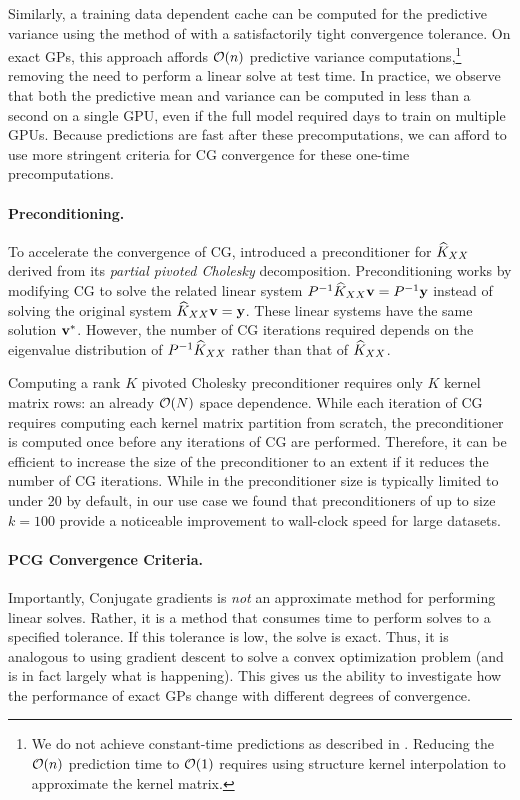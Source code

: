 Similarly, a training data dependent cache can be computed for the predictive variance using the method of \citet{pleiss2018constant} with a satisfactorily tight convergence tolerance.
On exact GPs, this approach affords $\bigo{n}$ predictive variance computations,\footnote{
  We do not achieve constant-time predictions as described in \cite{pleiss2018constant}.
  Reducing the $\bigo{n}$ prediction time to $\bigo{1}$ requires using structure kernel interpolation \cite{wilson2015kernel} to approximate the kernel matrix.
} removing the need to perform a linear solve at test time.
In practice, we observe that both the predictive mean and variance can be computed in less than a second on a single GPU, even if the full model required days to train on multiple GPUs.
Because predictions are fast after these precomputations, we can afford to use
more stringent criteria for CG convergence for these one-time precomputations.

\paragraph{Preconditioning.}
To accelerate the convergence of CG, \citet{gardner2018gpytorch} introduced a preconditioner for $\widehat{K}_{XX}$ derived from its \emph{partial pivoted Cholesky} decomposition. Preconditioning works by modifying CG to solve the related linear system $P^{-1} \widehat{K}_{XX} \mathbf{v} = P^{-1}\mathbf{y}$
instead of solving the original system $\widehat{K}_{XX} \mathbf{v} = \mathbf{y}$. These
linear systems have the same solution $\mathbf{v}^{*}$. However, the number of CG iterations required depends on the
eigenvalue distribution of $P^{-1}\widehat{K}_{XX}$ rather than that of $\widehat{K}_{XX}$.

Computing a rank $K$ pivoted Cholesky preconditioner requires only $K$ kernel matrix rows:
an already $\bigo{N}$ space dependence. While each iteration of CG requires computing each kernel matrix partition
from scratch, the preconditioner is computed once before any iterations of CG are performed. Therefore, it can be efficient to increase the size of the preconditioner to an extent if it reduces the number of CG iterations.
While in \citet{gardner2018gpytorch} the preconditioner size is typically limited to under 20 by default, in our use
case we found that preconditioners of up to size $k=100$ provide a noticeable improvement to wall-clock speed for large datasets.

\paragraph{PCG Convergence Criteria.}
Importantly, Conjugate gradients is \emph{not} an approximate method for performing linear solves. Rather, it is a method that consumes time to perform solves to a specified tolerance. If this tolerance is low, the solve is exact. Thus, it is analogous to using gradient descent to solve a convex optimization problem (and is in fact largely what is happening). This gives us the ability to investigate how the performance of exact GPs change with different degrees of convergence.

